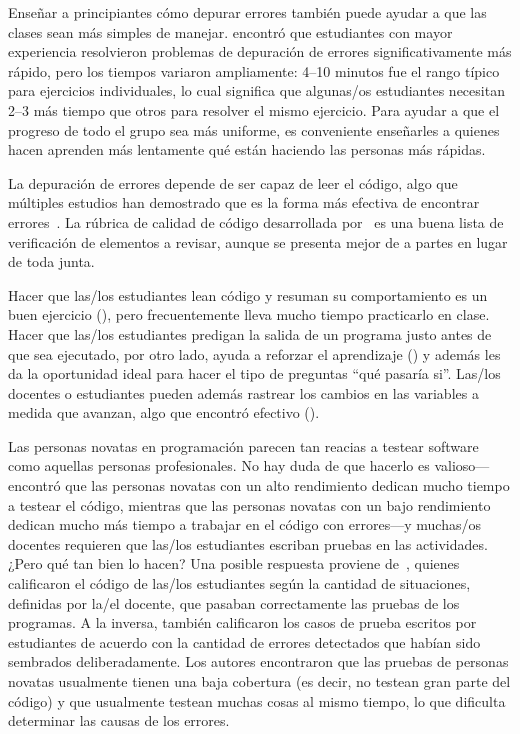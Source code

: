 Enseñar a principiantes cómo depurar errores también puede ayudar a que las clases sean más simples de manejar.
\cite{Alqa2017} encontró que estudiantes con mayor experiencia resolvieron problemas de depuración de errores significativamente más rápido,
pero los tiempos variaron ampliamente:
4--10 minutos fue el rango típico para ejercicios individuales,
lo cual significa que algunas/os estudiantes necesitan 2--3 más tiempo que otros para resolver el mismo ejercicio.
Para ayudar a que el progreso de todo el grupo sea más uniforme,
es conveniente enseñarles a quienes hacen aprenden más lentamente qué están haciendo las personas más rápidas.

La depuración de errores depende de ser capaz de leer el código,
algo que múltiples estudios han demostrado que es la forma más efectiva de encontrar errores~\cite{Basi1987,Keme2009,Bacc2013}.
La rúbrica de calidad de código desarrollada por~\cite{Steg2014,Steg2016a}
es una buena lista de verificación de elementos a revisar,
aunque se presenta mejor de a partes  en lugar  de toda junta.

Hacer que las/los estudiantes lean código y resuman su comportamiento es un buen ejercicio (),
pero frecuentemente lleva mucho tiempo practicarlo en clase.
Hacer que las/los estudiantes predigan la salida de un programa justo antes de que sea ejecutado,
por otro lado,
ayuda a reforzar el aprendizaje ()
y además les da la oportunidad ideal para hacer el tipo de preguntas ``qué pasaría si''.
Las/los docentes o estudiantes pueden además rastrear los cambios en las variables a medida que avanzan,
algo que  \cite{Cunn2017} encontró efectivo ().


Las personas novatas en programación parecen tan reacias a testear software como aquellas personas profesionales.
No hay duda de que hacerlo es valioso---\cite{Cart2017} encontró que
las personas novatas con un alto rendimiento dedican mucho tiempo a testear el código,
mientras que las personas novatas con un bajo rendimiento dedican mucho más tiempo a trabajar en el código con errores---y muchas/os docentes
requieren que las/los estudiantes escriban pruebas en las actividades.
¿Pero qué tan bien lo hacen?
Una posible respuesta proviene de~\cite{Bria2015},
quienes calificaron el código de las/los estudiantes según la cantidad de situaciones, definidas por la/el docente, que pasaban correctamente las pruebas de los programas.
A la inversa, también calificaron
los casos de prueba escritos por estudiantes de acuerdo con la cantidad de errores detectados que habían sido sembrados deliberadamente.
Los autores encontraron que las pruebas de personas novatas usualmente tienen una baja cobertura (es decir, no testean gran parte del código)
y que usualmente testean muchas cosas al mismo tiempo, lo que dificulta determinar las causas de los errores.

